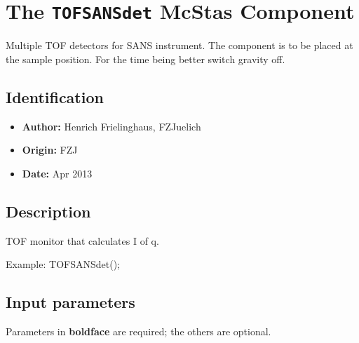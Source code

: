 \section{The \texttt{TOFSANSdet} McStas Component}
Multiple TOF detectors for SANS instrument.
The component is to be placed at the sample position.
For the time being better switch gravity off.

\subsection*{Identification}
\begin{itemize}
  \item \textbf{Author:} Henrich Frielinghaus, FZJuelich
  \item \textbf{Origin:} FZJ
  \item \textbf{Date:} Apr 2013
\end{itemize}

\subsection*{Description}
TOF monitor that calculates I of q.

Example: TOFSANSdet();

\subsection*{Input parameters}
Parameters in \textbf{boldface} are required; the others are optional.

